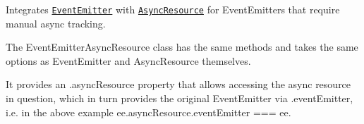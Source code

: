 Integrates \href{https://nodejs.org/api/events.html\#events_class_eventemitter}{\texttt{ {\ttfamily Event\+Emitter}}} with \href{https://nodejs.org/api/async_hooks.html\#async_hooks_class_asyncresource}{\texttt{ {\ttfamily Async\+Resource}}} for {\ttfamily Event\+Emitter}s that require manual async tracking.


\begin{DoxyCode}{0}
\DoxyCodeLine{}
\DoxyCodeLine{}

\end{DoxyCode}


The {\ttfamily Event\+Emitter\+Async\+Resource} class has the same methods and takes the same options as {\ttfamily Event\+Emitter} and {\ttfamily Async\+Resource} themselves.

It provides an {\ttfamily .async\+Resource} property that allows accessing the async resource in question, which in turn provides the original {\ttfamily Event\+Emitter} via {\ttfamily .event\+Emitter}, i.\+e. in the above example {\ttfamily ee.\+async\+Resource.\+event\+Emitter === ee}. 